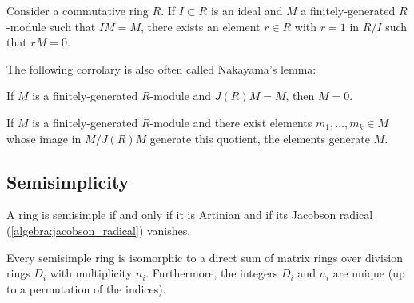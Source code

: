     \begin{theorem}\label{algebra:nakayama}
        Consider a commutative ring $R$. If $I\subset R$ is an ideal and $M$ a finitely-generated $R$-module such that $IM=M$, there exists an element $r\in R$ with $r=1$ in $R/I$ such that $rM=0$.
    \end{theorem}
    The following corrolary is also often called Nakayama's lemma:
    \begin{result}
        If $M$ is a finitely-generated $R$-module and $J(R)M=M$, then $M=0$.
    \end{result}
    \begin{result}
        If $M$ is a finitely-generated $R$-module and there exist elements $m_1,\ldots,m_k\in M$ whose image in $M/J(R)M$ generate this quotient, the elements generate $M$.
    \end{result}

\subsection{Semisimplicity}

    \begin{property}
        A ring is semisimple if and only if it is Artinian and if its Jacobson radical (\cref{algebra:jacobson_radical}) vanishes.
    \end{property}

    \begin{theorem}\label{algebra:artin_wedderburn}
        Every semisimple ring is isomorphic to a direct sum of matrix rings over division rings $D_i$ with multiplicity $n_i$. Furthermore, the integers $D_i$ and $n_i$ are unique (up to a permutation of the indices).
    \end{theorem}

\section{}

